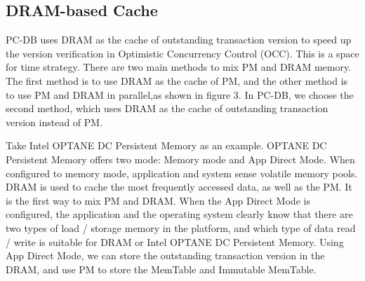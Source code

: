 \subsection{DRAM-based Cache}
PC-DB uses DRAM as the cache of outstanding transaction version to speed up the version verification in Optimistic Concurrency Control (OCC). This is a space for time strategy.
There are two main methods to mix PM and DRAM memory. The first method is to use DRAM as the cache of PM, and the other method is to use PM and DRAM in parallel,as shown in figure 3. In PC-DB, we choose the second method, which uses DRAM as the cache of outstanding transaction version instead of PM.

Take Intel OPTANE DC Persistent Memory\cite{OPTANE} as an example. OPTANE DC Persistent Memory offers two mode: Memory mode and App Direct Mode. When configured to memory mode, application and system sense volatile memory pools. DRAM is used to cache the most frequently accessed data, as well as the PM. It is the first way to mix PM and DRAM. When the App Direct Mode is configured, the application and the operating system clearly know that there are two types of load / storage memory in the platform, and which type of data read / write is suitable for DRAM or Intel OPTANE DC Persistent Memory. Using App Direct Mode, we can store the outstanding transaction version in the DRAM, and use PM to store the MemTable and Immutable MemTable.

